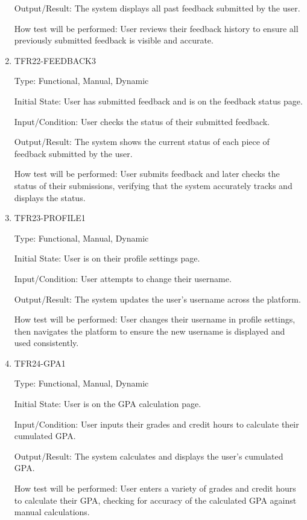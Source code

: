 \documentclass[12pt, titlepage]{article}
\begin{document}
\begin{enumerate}
Output/Result: The system displays all past feedback submitted by the user.

How test will be performed: User reviews their feedback history to ensure all previously submitted feedback is visible and accurate.

\item{TFR22-FEEDBACK3\\}\label{TFR22-FEEDBACK3}

Type: Functional, Manual, Dynamic

Initial State: User has submitted feedback and is on the feedback status page.

Input/Condition: User checks the status of their submitted feedback.

Output/Result: The system shows the current status of each piece of feedback submitted by the user.

How test will be performed: User submits feedback and later checks the status of their submissions, verifying that the system accurately tracks and displays the status.

\item{TFR23-PROFILE1\\}\label{TFR23-PROFILE1}

Type: Functional, Manual, Dynamic

Initial State: User is on their profile settings page.

Input/Condition: User attempts to change their username.

Output/Result: The system updates the user's username across the platform.

How test will be performed: User changes their username in profile settings, then navigates the platform to ensure the new username is displayed and used consistently.

\item{TFR24-GPA1\\}\label{TFR24-GPA1}

Type: Functional, Manual, Dynamic

Initial State: User is on the GPA calculation page.

Input/Condition: User inputs their grades and credit hours to calculate their cumulated GPA.

Output/Result: The system calculates and displays the user's cumulated GPA.

How test will be performed: User enters a variety of grades and credit hours to calculate their GPA, checking for accuracy of the calculated GPA against manual calculations.



\end{enumerate}
\end{document}
